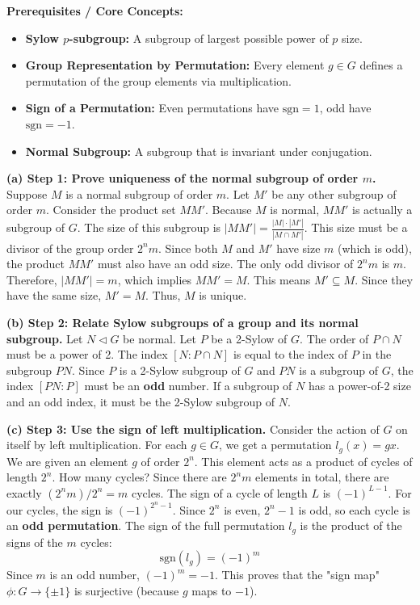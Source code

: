 \begin{solution}
\textbf{Prerequisites / Core Concepts:}
\begin{itemize}
    \item \textbf{Sylow $p$-subgroup:} A subgroup of largest possible power of $p$ size.
    \item \textbf{Group Representation by Permutation:} Every element $g \in G$ defines a permutation of the group elements via multiplication.
    \item \textbf{Sign of a Permutation:} Even permutations have $\text{sgn}=1$, odd have $\text{sgn}=-1$.
    \item \textbf{Normal Subgroup:} A subgroup that is invariant under conjugation.
\end{itemize}

\textbf{(a) Step 1: Prove uniqueness of the normal subgroup of order $m$.}
Suppose $M$ is a normal subgroup of order $m$. Let $M'$ be any other subgroup of order $m$.
Consider the product set $MM'$. Because $M$ is normal, $MM'$ is actually a subgroup of $G$.
The size of this subgroup is $|MM'| = \frac{|M| \cdot |M'|}{|M \cap M'|}$. This size must be a divisor of the group order $2^n m$.
Since both $M$ and $M'$ have size $m$ (which is odd), the product $MM'$ must also have an odd size.
The only odd divisor of $2^n m$ is $m$.
Therefore, $|MM'| = m$, which implies $MM' = M$. This means $M' \subseteq M$.
Since they have the same size, $M' = M$. Thus, $M$ is unique.

\textbf{(b) Step 2: Relate Sylow subgroups of a group and its normal subgroup.}
Let $N \triangleleft G$ be normal. Let $P$ be a 2-Sylow of $G$.
The order of $P \cap N$ must be a power of 2.
The index $[N : P \cap N]$ is equal to the index of $P$ in the subgroup $PN$.
Since $P$ is a 2-Sylow subgroup of $G$ and $PN$ is a subgroup of $G$, the index $[PN : P]$ must be an \textbf{odd} number.
If a subgroup of $N$ has a power-of-2 size and an odd index, it must be the 2-Sylow subgroup of $N$.

\textbf{(c) Step 3: Use the sign of left multiplication.}
Consider the action of $G$ on itself by left multiplication. For each $g \in G$, we get a permutation $l_g(x) = gx$.
We are given an element $g$ of order $2^n$. This element acts as a product of cycles of length $2^n$.
How many cycles? Since there are $2^n m$ elements in total, there are exactly $(2^n m) / 2^n = m$ cycles.
The sign of a cycle of length $L$ is $(-1)^{L-1}$. For our cycles, the sign is $(-1)^{2^n - 1}$.
Since $2^n$ is even, $2^n - 1$ is odd, so each cycle is an \textbf{odd permutation}.
The sign of the full permutation $l_g$ is the product of the signs of the $m$ cycles:
\[ \text{sgn}(l_g) = (-1)^m \]
Since $m$ is an odd number, $(-1)^m = -1$.
This proves that the "sign map" $\phi: G \to \{\pm 1\}$ is surjective (because $g$ maps to $-1$).


\end{solution}
